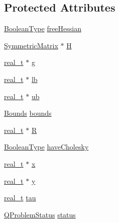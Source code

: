 \subsection*{Protected Attributes}
\begin{DoxyCompactItemize}
\item 
\hyperlink{_types_8hpp_a20f82124c82b6f5686a7fce454ef9089}{Boolean\+Type} \hyperlink{class_q_problem_b_a289ddec30e99470ebaa44aabd9f2ac7f}{free\+Hessian}
\item 
\hyperlink{class_symmetric_matrix}{Symmetric\+Matrix} $\ast$ \hyperlink{class_q_problem_b_a10b5660ca133fee1cedbb9636cea8431}{H}
\item 
\hyperlink{qp_o_a_s_e_s__wrapper_8h_a0d00e2b3dfadee81331bbb39068570c4}{real\+\_\+t} $\ast$ \hyperlink{class_q_problem_b_a3efcc81e7338d5d41c99e58a766315ba}{g}
\item 
\hyperlink{qp_o_a_s_e_s__wrapper_8h_a0d00e2b3dfadee81331bbb39068570c4}{real\+\_\+t} $\ast$ \hyperlink{class_q_problem_b_a424f1b8c4badffef270a68a461671d44}{lb}
\item 
\hyperlink{qp_o_a_s_e_s__wrapper_8h_a0d00e2b3dfadee81331bbb39068570c4}{real\+\_\+t} $\ast$ \hyperlink{class_q_problem_b_ae7d207471df9894e89e974b252fc341e}{ub}
\item 
\hyperlink{class_bounds}{Bounds} \hyperlink{class_q_problem_b_af0822225676e7ca195a0724a8841c4d9}{bounds}
\item 
\hyperlink{qp_o_a_s_e_s__wrapper_8h_a0d00e2b3dfadee81331bbb39068570c4}{real\+\_\+t} $\ast$ \hyperlink{class_q_problem_b_a8402fb9f4dbfaa9ad433457ba03751f0}{R}
\item 
\hyperlink{_types_8hpp_a20f82124c82b6f5686a7fce454ef9089}{Boolean\+Type} \hyperlink{class_q_problem_b_a3647c70d0d4fba3f2afe2cca4d289102}{have\+Cholesky}
\item 
\hyperlink{qp_o_a_s_e_s__wrapper_8h_a0d00e2b3dfadee81331bbb39068570c4}{real\+\_\+t} $\ast$ \hyperlink{class_q_problem_b_af5f392cdcebe7abe2fc827929e8cfe3b}{x}
\item 
\hyperlink{qp_o_a_s_e_s__wrapper_8h_a0d00e2b3dfadee81331bbb39068570c4}{real\+\_\+t} $\ast$ \hyperlink{class_q_problem_b_a3fcf4f7abdb0189fd304e6bd31431d4f}{y}
\item 
\hyperlink{qp_o_a_s_e_s__wrapper_8h_a0d00e2b3dfadee81331bbb39068570c4}{real\+\_\+t} \hyperlink{class_q_problem_b_a382545a2e9cf4591bf372c9297cac294}{tau}
\item 
\hyperlink{_types_8hpp_a8d5ce5a92124dc0106a5720f6d9a5abd}{Q\+Problem\+Status} \hyperlink{class_q_problem_b_acc7ad0699dc78f9376ac5d5e84517b47}{status}

\end{DoxyCompactItemize}
